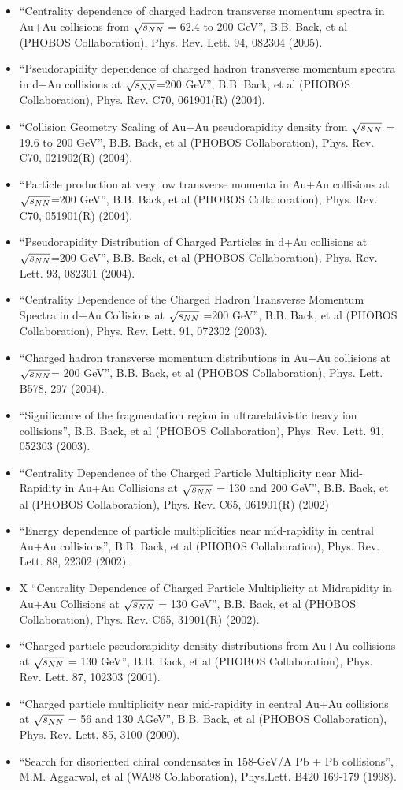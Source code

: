 \documentclass[11 pt]{article}
\begin{document}
\begin{description}
\begin{itemize}
\item ``Centrality dependence of charged hadron transverse momentum spectra in Au+Au collisions from $\sqrt{s_{NN}}$ = 62.4 to 200 GeV'', B.B. Back, et al (PHOBOS Collaboration), Phys. Rev. Lett.  94, 082304 (2005).
\item ``Pseudorapidity dependence of charged hadron transverse momentum spectra in d+Au collisions at $\sqrt{s_{NN}}$=200 GeV'', B.B. Back, et al (PHOBOS Collaboration), Phys. Rev. C70, 061901(R) (2004).
\item ``Collision Geometry Scaling of Au+Au pseudorapidity density from $\sqrt{s_{NN}}$ = 19.6 to 200 GeV'', B.B. Back, et al (PHOBOS Collaboration), Phys. Rev. C70, 021902(R) (2004).
\item ``Particle production at very low transverse momenta in Au+Au collisions at $\sqrt{s_{NN}}$=200 GeV'', B.B. Back, et al (PHOBOS Collaboration), Phys. Rev. C70, 051901(R) (2004).
\item ``Pseudorapidity Distribution of Charged Particles in d+Au collisions at $\sqrt{s_{NN}}$=200 GeV'', B.B. Back, et al (PHOBOS Collaboration), Phys. Rev. Lett. 93, 082301 (2004).
\item ``Centrality Dependence of the Charged Hadron Transverse Momentum Spectra in d+Au Collisions at $\sqrt{s_{NN}}$ =200 GeV'', B.B. Back, et al (PHOBOS Collaboration), Phys. Rev. Lett. 91, 072302 (2003).
\item ``Charged hadron transverse momentum distributions in Au+Au collisions at $\sqrt{s_{NN}}$= 200 GeV'', B.B. Back, et al (PHOBOS Collaboration), Phys. Lett. B578, 297 (2004).
\item ``Significance of the fragmentation region in ultrarelativistic heavy ion collisions'', B.B. Back, et al (PHOBOS Collaboration), Phys. Rev. Lett. 91, 052303 (2003).
\item  ``Centrality Dependence of the Charged Particle Multiplicity near Mid-Rapidity in  Au+Au Collisions at $\sqrt{s_{NN}}$ = 130 and 200 GeV'', B.B. Back, et al (PHOBOS Collaboration), Phys. Rev. C65, 061901(R) (2002)
\item ``Energy dependence of particle multiplicities near mid-rapidity in central Au+Au collisions'', B.B. Back, et al (PHOBOS Collaboration), Phys. Rev. Lett. 88, 22302 (2002).
\item X ``Centrality Dependence of Charged Particle Multiplicity at Midrapidity in Au+Au Collisions at $\sqrt{s_{NN}}$ = 130 GeV'', B.B. Back, et al (PHOBOS Collaboration), Phys. Rev. C65, 31901(R) (2002).
\item ``Charged-particle pseudorapidity density distributions from Au+Au collisions at $\sqrt{s_{NN}}$ = 130 GeV'', B.B. Back, et al (PHOBOS Collaboration), Phys. Rev. Lett. 87, 102303 (2001).
\item  ``Charged particle multiplicity near mid-rapidity in central Au+Au collisions at $\sqrt{s_{NN}}$ = 56 and 130 AGeV'', B.B. Back, et al (PHOBOS Collaboration), Phys. Rev. Lett. 85, 3100 (2000).
\item ``Search for disoriented chiral condensates in 158-GeV/A Pb + Pb collisions'', M.M. Aggarwal, et al (WA98 Collaboration), Phys.Lett. B420 169-179 (1998).
\end{itemize}


\end{description}
\end{document}
